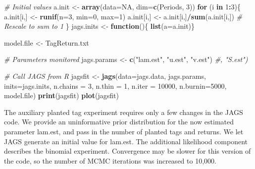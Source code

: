 \documentclass[
]{krantz}
\makeatletter
\newenvironment{Shaded}{\begin{snugshade}}{\end{snugshade}}
\newcommand{\AttributeTok}[1]{\textcolor[rgb]{0.27,0.27,0.27}{#1}}
\newcommand{\CommentTok}[1]{\textcolor[rgb]{0.37,0.37,0.37}{\textit{#1}}}
\newcommand{\ConstantTok}[1]{\textcolor[rgb]{0.37,0.37,0.37}{#1}}
\newcommand{\ControlFlowTok}[1]{\textcolor[rgb]{0.27,0.27,0.27}{\textbf{#1}}}
\newcommand{\DecValTok}[1]{\textcolor[rgb]{0.06,0.06,0.06}{#1}}
\newcommand{\FunctionTok}[1]{\textcolor[rgb]{0.27,0.27,0.27}{\textbf{#1}}}
\newcommand{\NormalTok}[1]{#1}
\newcommand{\OtherTok}[1]{\textcolor[rgb]{0.37,0.37,0.37}{#1}}
\newcommand{\SpecialCharTok}[1]{\textcolor[rgb]{0.43,0.43,0.43}{\textbf{#1}}}
\newcommand{\StringTok}[1]{\textcolor[rgb]{0.5,0.5,0.5}{#1}}
\newenvironment{kframe}{%
\medskip{}
\setlength{\fboxsep}{.8em}
 \def\at@end@of@kframe{}%
 \ifinner\ifhmode%
  \def\at@end@of@kframe{\end{minipage}}%
  \begin{minipage}{\columnwidth}%
 \fi\fi%
 \def\FrameCommand##1{\hskip\@totalleftmargin \hskip-\fboxsep
 \colorbox{shadecolor}{##1}\hskip-\fboxsep
     \hskip-\linewidth \hskip-\@totalleftmargin \hskip\columnwidth}%
 \MakeFramed {\advance\hsize-\width
   \@totalleftmargin\z@ \linewidth\hsize
   \@setminipage}}%
 {\par\unskip\endMakeFramed%
 \at@end@of@kframe}
\renewenvironment{Shaded}{\begin{kframe}}{\end{kframe}}
\makeatother
\begin{document}
\begin{Shaded}
\begin{Highlighting}[]
\CommentTok{\# Initial values}
\NormalTok{  a.init }\OtherTok{\textless{}{-}} \FunctionTok{array}\NormalTok{(}\AttributeTok{data=}\ConstantTok{NA}\NormalTok{, }\AttributeTok{dim=}\FunctionTok{c}\NormalTok{(Periods, }\DecValTok{3}\NormalTok{))}
  \ControlFlowTok{for}\NormalTok{ (i }\ControlFlowTok{in} \DecValTok{1}\SpecialCharTok{:}\DecValTok{3}\NormalTok{)\{}
\NormalTok{    a.init[i,] }\OtherTok{\textless{}{-}} \FunctionTok{runif}\NormalTok{(}\AttributeTok{n=}\DecValTok{3}\NormalTok{, }\AttributeTok{min=}\DecValTok{0}\NormalTok{, }\AttributeTok{max=}\DecValTok{1}\NormalTok{)}
\NormalTok{    a.init[i,] }\OtherTok{\textless{}{-}}\NormalTok{ a.init[i,]}\SpecialCharTok{/}\FunctionTok{sum}\NormalTok{(a.init[i,])  }\CommentTok{\# Rescale to sum to 1}
\NormalTok{  \}}
\NormalTok{  jags.inits }\OtherTok{\textless{}{-}} \ControlFlowTok{function}\NormalTok{()\{ }\FunctionTok{list}\NormalTok{(}\AttributeTok{a=}\NormalTok{a.init)\}}

\NormalTok{  model.file }\OtherTok{\textless{}{-}} \StringTok{\textquotesingle{}TagReturn.txt\textquotesingle{}}

  \CommentTok{\# Parameters monitored}
\NormalTok{  jags.params }\OtherTok{\textless{}{-}} \FunctionTok{c}\NormalTok{(}\StringTok{"lam.est"}\NormalTok{, }\StringTok{"u.est"}\NormalTok{, }\StringTok{"v.est"}\NormalTok{)}
  \CommentTok{\#, "S.est")}

   \CommentTok{\# Call JAGS from R}
\NormalTok{  jagsfit }\OtherTok{\textless{}{-}} \FunctionTok{jags}\NormalTok{(}\AttributeTok{data=}\NormalTok{jags.data, jags.params, }\AttributeTok{inits=}\NormalTok{jags.inits,}
                  \AttributeTok{n.chains =} \DecValTok{3}\NormalTok{, }\AttributeTok{n.thin =} \DecValTok{1}\NormalTok{, }\AttributeTok{n.iter =} \DecValTok{10000}\NormalTok{, }\AttributeTok{n.burnin=}\DecValTok{5000}\NormalTok{,}
\NormalTok{                  model.file)}
  \FunctionTok{print}\NormalTok{(jagsfit)}
  \FunctionTok{plot}\NormalTok{(jagsfit)}
\end{Highlighting}
\end{Shaded}

The auxiliary planted tag experiment requires only a few changes in the JAGS code. We provide an uninformative prior distribution for the now estimated parameter lam.est, and pass in the number of planted tags and returns. We let JAGS generate an initial value for lam.est. The additional likelihood component describes the binomial experiment. Convergence may be slower for this version of the code, so the number of MCMC iterations was increased to 10,000.
\end{document}
